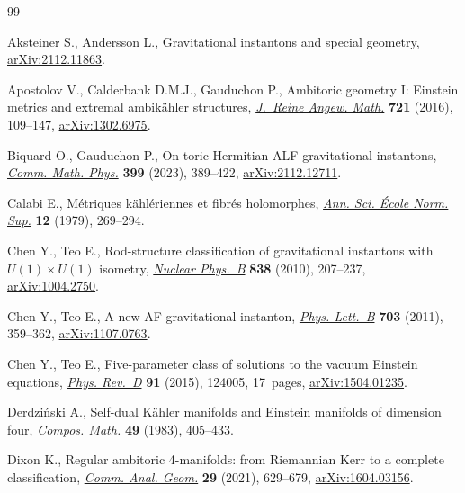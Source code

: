 \begin{thebibliography}{99}
\footnotesize\itemsep=0pt

Aksteiner S., Andersson L., Gravitational instantons and special geometry,
 \href{https://arxiv.org/abs/2112.11863}{arXiv:2112.11863}.

Apostolov V., Calderbank D.M.J., Gauduchon P., Ambitoric geometry {I}:
 {E}instein metrics and extremal ambik\"ahler structures, \href{https://doi.org/10.1515/crelle-2014-0060}{\textit{J.~Reine
 Angew. Math.}} \textbf{721} (2016), 109--147, \href{https://arxiv.org/abs/1302.6975}{arXiv:1302.6975}.

Biquard O., Gauduchon P., On toric {H}ermitian {ALF} gravitational instantons,
 \href{https://doi.org/10.1007/s00220-022-04562-z}{\textit{Comm. Math. Phys.}} \textbf{399} (2023), 389--422,
 \href{https://arxiv.org/abs/2112.12711}{arXiv:2112.12711}.

Calabi E., M\'etriques k\"ahl\'eriennes et fibr\'es holomorphes, \href{https://doi.org/10.24033/asens.1367}{\textit{Ann.
 Sci. \'Ecole Norm. Sup.}} \textbf{12} (1979), 269--294.

Chen Y., Teo E., Rod-structure classification of gravitational instantons with
 {$U(1)\times U(1)$} isometry, \href{https://doi.org/10.1016/j.nuclphysb.2010.05.017}{\textit{Nuclear Phys.~B}} \textbf{838} (2010),
 207--237, \href{https://arxiv.org/abs/1004.2750}{arXiv:1004.2750}.

Chen Y., Teo E., A new {AF} gravitational instanton, \href{https://doi.org/10.1016/j.physletb.2011.07.076}{\textit{Phys. Lett.~B}}
 \textbf{703} (2011), 359--362, \href{https://arxiv.org/abs/1107.0763}{arXiv:1107.0763}.

Chen Y., Teo E., Five-parameter class of solutions to the vacuum {E}instein
 equations, \href{https://doi.org/10.1103/PhysRevD.91.124005}{\textit{Phys. Rev.~D}} \textbf{91} (2015), 124005, 17~pages,
 \href{https://arxiv.org/abs/1504.01235}{arXiv:1504.01235}.

Derdzi\'nski A., Self-dual {K}\"ahler manifolds and {E}instein manifolds of
 dimension four, \textit{Compos. Math.} \textbf{49} (1983), 405--433.

Dixon K., Regular ambitoric 4-manifolds: from {R}iemannian {K}err to a complete
 classification, \href{https://doi.org/10.4310/CAG.2021.v29.n3.a3}{\textit{Comm. Anal. Geom.}} \textbf{29} (2021), 629--679,
 \href{https://arxiv.org/abs/1604.03156}{arXiv:1604.03156}.


\end{thebibliography}
